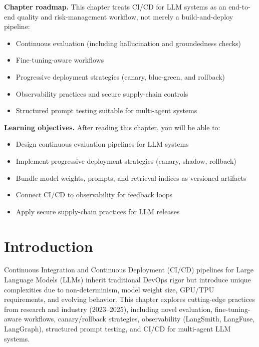 \begin{tcolorbox}[
  title={\textbf{Chapter Overview}},
  colback=blue!5,
  colframe=blue!40!black,
  colbacktitle=blue!20,
  coltitle=black,
  fonttitle=\bfseries,
  boxrule=0.7pt,
  arc=4pt,
  left=5mm, right=5mm, top=4mm, bottom=4mm
]
\noindent\textbf{Chapter roadmap.}
This chapter treats CI/CD for LLM systems as an end-to-end quality and risk-management workflow, not merely a build-and-deploy pipeline:
\begin{itemize}[leftmargin=1.5em, itemsep=3pt]
    \item Continuous evaluation (including hallucination and groundedness checks)
    \item Fine-tuning-aware workflows
    \item Progressive deployment strategies (canary, blue-green, and rollback)
    \item Observability practices and secure supply-chain controls
    \item Structured prompt testing suitable for multi-agent systems
\end{itemize}

\medskip
\noindent\textbf{Learning objectives.} After reading this chapter, you will be able to:
\begin{itemize}[leftmargin=1.5em, itemsep=3pt]
    \item Design continuous evaluation pipelines for LLM systems
    \item Implement progressive deployment strategies (canary, shadow, rollback)
    \item Bundle model weights, prompts, and retrieval indices as versioned artifacts
    \item Connect CI/CD to observability for feedback loops
    \item Apply secure supply-chain practices for LLM releases
\end{itemize}
\end{tcolorbox}


\section{Introduction}
\label{sec:cicd-intro}
Continuous Integration and Continuous Deployment (CI/CD) pipelines for Large Language Models (LLMs) inherit traditional DevOps rigor but introduce unique complexities due to non-determinism, model weight size, GPU/TPU requirements, and evolving behavior. This chapter explores cutting-edge practices from research and industry (2023--2025), including novel evaluation, fine-tuning-aware workflows, canary/rollback strategies, observability (LangSmith, LangFuse, LangGraph), structured prompt testing, and CI/CD for multi-agent LLM systems.

